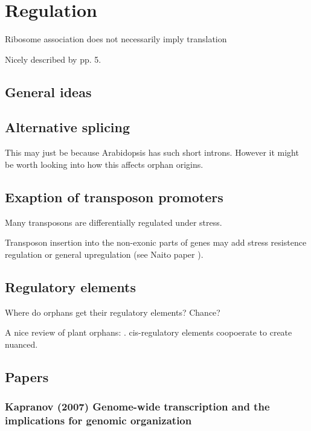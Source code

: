 \section{Regulation}
  Ribosome association does not necessarily imply translation
  \cite{guttman_ribosome_2013}

  Nicely described by \cite{tautz_evolutionary_2011} pp. 5.

  \subsection{General ideas}

  \subsection{Alternative splicing}


      This may just be because Arabidopsis has such short introns. However it
      might be worth looking into how this affects orphan origins.

  \subsection{Exaption of transposon promoters}

    Many transposons are differentially regulated under stress.

    Transposon insertion into the non-exonic parts of genes may add stress
    resistence regulation or general upregulation (see Naito paper \cite{naito_unexpected_2009}).


  \subsection{Regulatory elements}

    Where do orphans get their regulatory elements? Chance?

    A nice review of plant orphans: \cite{priest_cis-regulatory_2009}.
    cis-regulatory elements coopoerate to create nuanced.

  \subsection{Papers}

    \subsubsection{Kapranov (2007) Genome-wide transcription and the
    implications for genomic organization}

